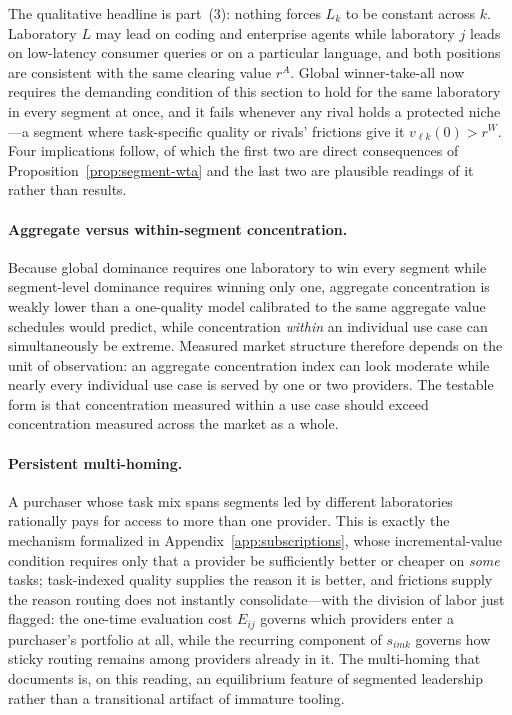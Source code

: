 \documentclass[11pt]{article}
\begin{document}
The qualitative headline is part~(3): nothing forces $L_k$ to be constant across $k$. Laboratory $L$ may lead on coding and enterprise agents while laboratory $j$ leads on low-latency consumer queries or on a particular language, and both positions are consistent with the same clearing value $r^A$. Global winner-take-all now requires the demanding condition of this section to hold for the same laboratory in every segment at once, and it fails whenever any rival holds a protected niche---a segment where task-specific quality or rivals' frictions give it $v_{\ell k}(0)>r^W$. Four implications follow, of which the first two are direct consequences of Proposition~\ref{prop:segment-wta} and the last two are plausible readings of it rather than results.

\paragraph{Aggregate versus within-segment concentration.} Because global dominance requires one laboratory to win every segment while segment-level dominance requires winning only one, aggregate concentration is weakly lower than a one-quality model calibrated to the same aggregate value schedules would predict, while concentration \emph{within} an individual use case can simultaneously be extreme. Measured market structure therefore depends on the unit of observation: an aggregate concentration index can look moderate while nearly every individual use case is served by one or two providers. The testable form is that concentration measured within a use case should exceed concentration measured across the market as a whole.

\paragraph{Persistent multi-homing.} A purchaser whose task mix spans segments led by different laboratories rationally pays for access to more than one provider. This is exactly the mechanism formalized in Appendix~\ref{app:subscriptions}, whose incremental-value condition requires only that a provider be sufficiently better or cheaper on \emph{some} tasks; task-indexed quality supplies the reason it is better, and frictions supply the reason routing does not instantly consolidate---with the division of labor just flagged: the one-time evaluation cost $E_{ij}$ governs which providers enter a purchaser's portfolio at all, while the recurring component of $s_{imk}$ governs how sticky routing remains among providers already in it. The multi-homing that \citet{fradkin2025demand} documents is, on this reading, an equilibrium feature of segmented leadership rather than a transitional artifact of immature tooling.
\end{document}
